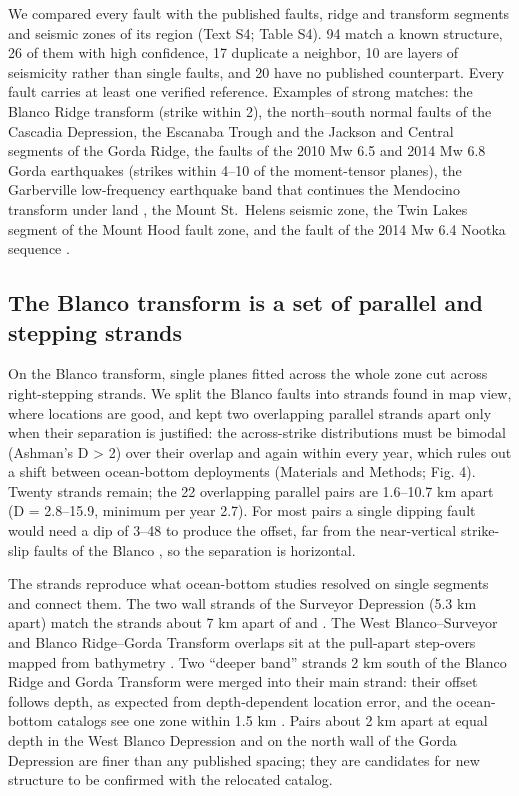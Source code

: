 \documentclass[11pt]{article}
\begin{document}
We compared every fault with the published faults, ridge and transform
segments and seismic zones of its region (Text S4; Table S4). 94 match a
known structure, 26 of them with high confidence, 17 duplicate a
neighbor, 10 are layers of seismicity rather than single faults, and 20
have no published counterpart. Every fault carries at least one verified
reference. Examples of strong matches: the Blanco Ridge transform
(strike within 2\textdegree{}), the north--south normal faults of the Cascadia
Depression, the Escanaba Trough and the Jackson and Central segments of
the Gorda Ridge, the faults of the 2010 Mw 6.5 and 2014 Mw 6.8 Gorda
earthquakes (strikes within 4--10\textdegree{} of the moment-tensor planes), the
Garberville low-frequency earthquake band that continues the Mendocino
transform under land \citep{Shelly2025, Shelly2026}, the Mount
St.~Helens seismic zone, the Twin Lakes segment of the Mount Hood fault
zone, and the fault of the 2014 Mw 6.4 Nootka sequence
\citep{Hutchinson2023}.

\subsection{The Blanco transform is a set of parallel and stepping
strands}\label{the-blanco-transform-is-a-set-of-parallel-and-stepping-strands}

On the Blanco transform, single planes fitted across the whole zone cut
across right-stepping strands. We split the Blanco faults into strands
found in map view, where locations are good, and kept two overlapping
parallel strands apart only when their separation is justified: the
across-strike distributions must be bimodal (Ashman's D \textgreater{}
2) \citep{Ashman1994} over their overlap and again within every year,
which rules out a shift between ocean-bottom deployments (Materials and
Methods; Fig. 4). Twenty strands remain; the 22 overlapping parallel
pairs are 1.6--10.7 km apart (D = 2.8--15.9, minimum per year 2.7). For
most pairs a single dipping fault would need a dip of 3--48\textdegree{} to produce
the offset, far from the near-vertical strike-slip faults of the Blanco
\citep{Braunmiller2008}, so the separation is horizontal.

The strands reproduce what ocean-bottom studies resolved on single
segments and connect them. The two wall strands of the Surveyor
Depression (5.3 km apart) match the strands about 7 km apart of
\citet{Ren2023} and \citet{Lange2026}. The West Blanco--Surveyor and
Blanco Ridge--Gorda Transform overlaps sit at the pull-apart step-overs
mapped from bathymetry \citep{Embley1992, Braunmiller2008}. Two ``deeper
band'' strands 2 km south of the Blanco Ridge and Gorda Transform were
merged into their main strand: their offset follows depth, as expected
from depth-dependent location error, and the ocean-bottom catalogs see
one zone within 1.5 km \citep{Lange2026, Kuna2019}. Pairs about 2 km
apart at equal depth in the West Blanco Depression and on the north wall
of the Gorda Depression are finer than any published spacing; they are
candidates for new structure to be confirmed with the relocated catalog.
\end{document}
